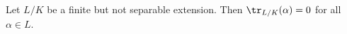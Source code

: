 \documentclass[a4paper]{article}
\begin{document}
%
%
%
%

\begin{thm}
  Let $L/K$ be a finite but not separable extension. Then $\tr_{L/K}(\alpha) = 0$ for all $\alpha \in L$.
\end{thm}
\end{document}
